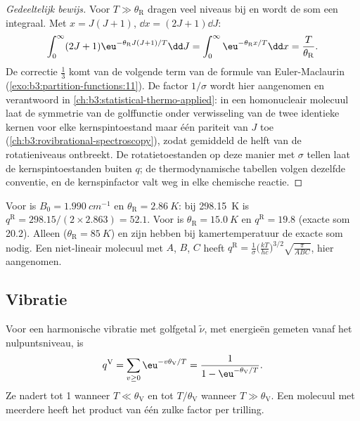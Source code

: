 \begin{proof}[Gedeeltelijk bewijs]
Voor $T \gg \theta_{\mathrm R}$ dragen veel niveaus bij en wordt de som een
integraal.
Met $x = J(J+1)$, $\dd x = (2J+1)\dd J$:
\[
  \int_0^\infty(2J+1)\eu^{-\theta_{\mathrm R}J(J+1)/T}\dd J = \int_0^\infty\eu^{-\theta_{\mathrm R}x/T}\dd x
  = \frac{T}{\theta_{\mathrm R}}.
\]
De correctie $\frac13$ komt van de volgende term van de formule van
Euler-Maclaurin
(\cref{exo:b3:partition-functions:11}). De factor $1/\sigma$ wordt hier
aangenomen en verantwoord in \cref{ch:b3:statistical-thermo-applied}: in
een homonucleair molecuul laat de symmetrie van de golffunctie onder
verwisseling van de twee identieke kernen voor elke kernspintoestand maar
één pariteit van $J$ toe
(\cref{ch:b3:rovibrational-spectroscopy}), zodat gemiddeld de helft van de
rotatieniveaus ontbreekt. De rotatietoestanden op deze manier met $\sigma$
tellen laat de kernspintoestanden buiten $q$; de thermodynamische tabellen
volgen dezelfde conventie, en de kernspinfactor valt weg in elke chemische
reactie.
\end{proof}

Voor  is $B_0 = \qty{1.990}{cm^{-1}}$ en $\theta_{\mathrm R} = \qty{2.86}{K}$: bij \qty{298.15}{K}
is $q^{\mathrm R} = 298.15/(2\times2.863) = 52.1$. Voor  is $\theta_{\mathrm R} = \qty{15.0}{K}$ en
$q^{\mathrm R} = 19.8$ (exacte som 20.2). Alleen  ($\theta_{\mathrm R} = \qty{85}{K}$)
en zijn  hebben bij kamertemperatuur de exacte som nodig. Een
niet-lineair molecuul met 
$A$, $B$, $C$ heeft $q^{\mathrm R} = \frac{1}{\sigma}\bigl(\frac{kT}{hc}\bigr)^{3/2}\sqrt{\frac{\pi}{ABC}}$, hier aangenomen.

\subsection*{Vibratie}

\begin{proposition}[Vibratietoestandssom]\label{prop:b3:partition-functions:q-vib}
Voor een harmonische vibratie met golfgetal $\tilde\nu$, met energieën
gemeten vanaf het nulpuntsniveau, is
\[
  q^{\mathrm V} = \sum_{v\ge0}\eu^{-v\theta_{\mathrm V}/T} = \frac{1}{1 - \eu^{-\theta_{\mathrm V}/T}} .
\]
Ze nadert tot 1 wanneer $T \ll \theta_{\mathrm V}$ en tot $T/\theta_{\mathrm V}$ wanneer $T \gg \theta_{\mathrm V}$. Een molecuul
met meerdere  heeft het product van één zulke factor per
trilling.
\end{proposition}

